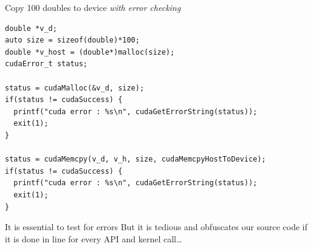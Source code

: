 \begin{frame}[fragile]{}

    \begin{code}{Copy 100 doubles to device \emph{with error checking}}
        \begin{lstlisting}[style=boxcudatiny]
double *v_d;
auto size = sizeof(double)*100;
double *v_host = (double*)malloc(size);
cudaError_t status;

status = cudaMalloc(&v_d, size);
if(status != cudaSuccess) {
  printf("cuda error : %s\n", cudaGetErrorString(status));
  exit(1);
}

status = cudaMemcpy(v_d, v_h, size, cudaMemcpyHostToDevice);
if(status != cudaSuccess) {
  printf("cuda error : %s\n", cudaGetErrorString(status));
  exit(1);
}
        \end{lstlisting}
    \end{code}

    \begin{info}{It is essential to test for errors}
        But it is tedious and obfuscates our source code if it is done in line for every API and kernel call\ldots
    \end{info}
\end{frame}

